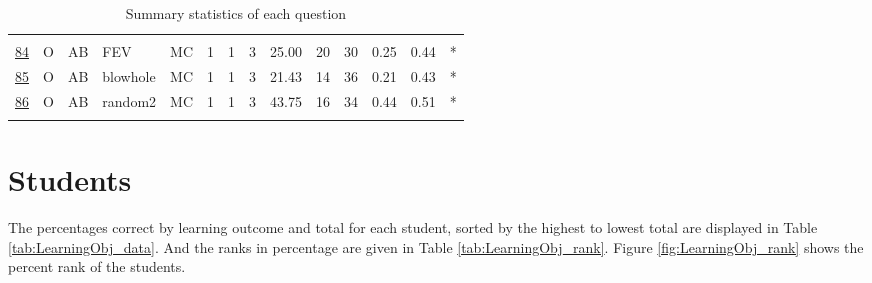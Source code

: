 \documentclass[12pt,english,nohyper]{tufte-handout}\usepackage[]{graphicx}\usepackage[]{color}
\begin{document}
\begin{longtable}{cccl|cccc|ccccc|l}
   &  &  &  &  &  &  &  &  &  &  &  &  &  \\ 
  \hyperlink{T03.O.AB.03.1.1.MC.FEV.2}{84} & O & AB & FEV & MC &   1 &   1 &   3 & 25.00 &  20 &  30 & 0.25 & 0.44 & * \\ 
  \hyperlink{T03.O.AB.03.1.1.MC.blowhole.2}{85} & O & AB & blowhole & MC &   1 &   1 &   3 & 21.43 &  14 &  36 & 0.21 & 0.43 & * \\ 
  \hyperlink{T03.O.AB.03.1.1.MC.random2.2}{86} & O & AB & random2 & MC &   1 &   1 &   3 & 43.75 &  16 &  34 & 0.44 & 0.51 & * \\ 
   \hline
\hline
\caption{Summary statistics of each question} 
\label{tab:summary_question}
\end{longtable}


\clearpage
\newpage{}
\section{Students}
The percentages correct by learning outcome and total for each student, sorted by the highest to lowest total are displayed in Table \ref{tab:LearningObj_data}. And the ranks in percentage are given in Table \ref{tab:LearningObj_rank}. Figure \ref{fig:LearningObj_rank} shows the percent rank of the students.
\end{document}
